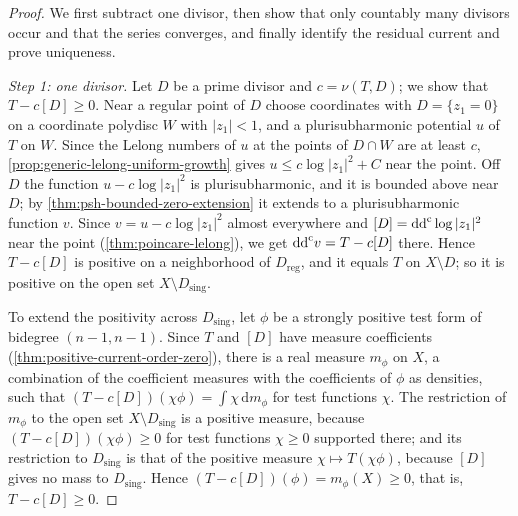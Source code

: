 \begin{proof}
We first subtract one divisor, then show that only countably many divisors occur and that the series converges, and finally identify the residual current and prove uniqueness.

\emph{Step 1: one divisor.} Let $D$ be a prime divisor and $c=\nu(T,D)$; we show that $T-c[D]\geq0$. Near a regular point of $D$ choose coordinates with $D=\{z_1=0\}$ on a coordinate polydisc $W$ with $|z_1|<1$, and a plurisubharmonic potential $u$ of $T$ on $W$. Since the Lelong numbers of $u$ at the points of $D\cap W$ are at least $c$, \cref{prop:generic-lelong-uniform-growth} gives $u\leq c\log|z_1|^2+C$ near the point. Off $D$ the function $u-c\log|z_1|^2$ is plurisubharmonic, and it is bounded above near $D$; by \cref{thm:psh-bounded-zero-extension} it extends to a plurisubharmonic function $v$. Since $v=u-c\log|z_1|^2$ almost everywhere and $[D]=\mathrm{dd}^{\mathrm{c}}\log|z_1|^2$ near the point (\cref{thm:poincare-lelong}), we get $\mathrm{dd}^{\mathrm{c}} v=T-c[D]$ there. Hence $T-c[D]$ is positive on a neighborhood of $D_{\mathrm{reg}}$, and it equals $T$ on $X\setminus D$; so it is positive on the open set $X\setminus D_{\mathrm{sing}}$.

To extend the positivity across $D_{\mathrm{sing}}$, let $\phi$ be a strongly positive test form of bidegree $(n-1,n-1)$. Since $T$ and $[D]$ have measure coefficients (\cref{thm:positive-current-order-zero}), there is a real measure $m_\phi$ on $X$, a combination of the coefficient measures with the coefficients of $\phi$ as densities, such that $(T-c[D])(\chi\phi)=\int\chi\,\mathrm dm_\phi$ for test functions $\chi$. The restriction of $m_\phi$ to the open set $X\setminus D_{\mathrm{sing}}$ is a positive measure, because $(T-c[D])(\chi\phi)\geq0$ for test functions $\chi\geq0$ supported there; and its restriction to $D_{\mathrm{sing}}$ is that of the positive measure $\chi\mapsto T(\chi\phi)$, because $[D]$ gives no mass to $D_{\mathrm{sing}}$. Hence $(T-c[D])(\phi)=m_\phi(X)\geq0$, that is, $T-c[D]\geq0$.


\end{proof}
